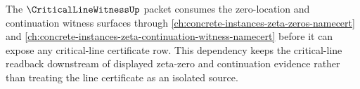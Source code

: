 The $\CriticalLineWitnessUp$ packet consumes the zero-location and continuation witness surfaces through \autoref{ch:concrete-instances-zeta-zeros-namecert} and \autoref{ch:concrete-instances-zeta-continuation-witness-namecert} before it can expose any critical-line certificate row. This dependency keeps the critical-line readback downstream of displayed zeta-zero and continuation evidence rather than treating the line certificate as an isolated source.
